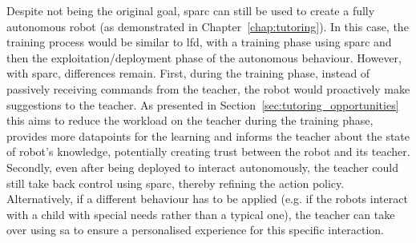 Despite not being the original goal, \gls{sparc} can still be used to create a fully autonomous robot (as demonstrated in Chapter~\ref{chap:tutoring}). In this case, the training process would be similar to \gls{lfd}, with a training phase using \gls{sparc} and then the exploitation/deployment phase of the autonomous behaviour. However, with \gls{sparc}, differences remain. First, during the training phase, instead of passively receiving commands from the teacher, the robot would proactively make suggestions to the teacher. As presented in Section~\ref{sec:tutoring_opportunities} this aims to reduce the workload on the teacher during the training phase, provides more datapoints for the learning and informs the teacher about the state of robot's knowledge, potentially creating trust between the robot and its teacher. Secondly, even after being deployed to interact autonomously, the teacher could still take back control using \gls{sparc}, thereby refining the action policy. Alternatively, if a different behaviour has to be applied (e.g. if the robots interact with a child with special needs rather than a typical one), the teacher can take over using \gls{sa} to ensure a personalised experience for this specific interaction.

